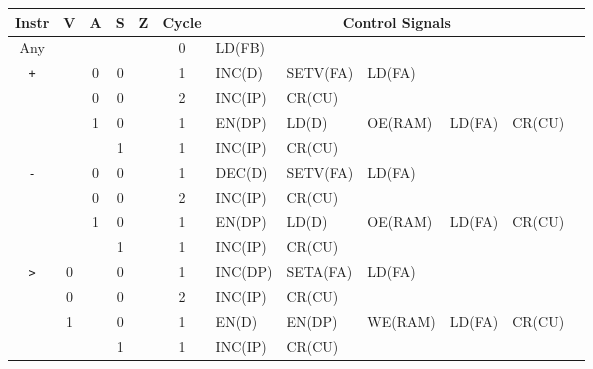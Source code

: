 

  \begin{longtable}[c] {c|cccc|c|llllll}
                     Instr        & V & A & S     & Z    & Cycle & \multicolumn{6}{c}{Control Signals}                      \\ \hline
    \rowcolor{White} Any          &   &   &       &      & 0     & LD(FB)   &          &         &        &        &        \\ \hline
    \rowcolor{Gray}  \texttt{+}   &   & 0 & 0     &      & 1     & INC(D)   & SETV(FA) & LD(FA)  &        &        &        \\
    \rowcolor{Gray}               &   & 0 & 0     &      & 2     & INC(IP)  & CR(CU)   &         &        &        &        \\    
    \rowcolor{White}              &   & 1 & 0     &      & 1     & EN(DP)   & LD(D)    & OE(RAM) & LD(FA) & CR(CU) &        \\
    \rowcolor{Gray}               &   &   & 1     &      & 1     & INC(IP)  & CR(CU)   &         &        &        &        \\ \hline
    
    \rowcolor{White} \texttt{-}   &   & 0 & 0     &      & 1     & DEC(D)   & SETV(FA) & LD(FA)  &        &        &        \\
    \rowcolor{White}              &   & 0 & 0     &      & 2     & INC(IP)  & CR(CU)   &         &        &        &        \\
    \rowcolor{Gray}               &   & 1 & 0     &      & 1     & EN(DP)   & LD(D)    & OE(RAM) & LD(FA) & CR(CU) &        \\
    \rowcolor{White}              &   &   & 1     &      & 1     & INC(IP)  & CR(CU)   &         &        &        &        \\ \hline
    
    \rowcolor{Gray}  \texttt{>}   & 0 &   & 0     &      & 1     & INC(DP)  & SETA(FA) & LD(FA)  &        &        &        \\
    \rowcolor{Gray}               & 0 &   & 0     &      & 2     & INC(IP)  & CR(CU)   &         &        &        &        \\
    \rowcolor{White}              & 1 &   & 0     &      & 1     & EN(D)    & EN(DP)   & WE(RAM) & LD(FA) & CR(CU) &        \\
    \rowcolor{Gray}               &   &   & 1     &      & 1     & INC(IP)  & CR(CU)   &         &        &        &        \\ \hline
    

\end{longtable}
